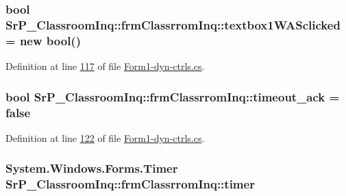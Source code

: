 \hypertarget{class_sr_p___classroom_inq_1_1frm_classrrom_inq_a998e499144884577e3445f4b721b4c6a}{
\subsubsection[{textbox1\-W\-A\-Sclicked}]{\setlength{\rightskip}{0pt plus 5cm}bool {\bf \-Sr\-P\-\_\-\-Classroom\-Inq\-::frm\-Classrrom\-Inq\-::textbox1\-W\-A\-Sclicked} = new bool()}}
\label{class_sr_p___classroom_inq_1_1frm_classrrom_inq_a998e499144884577e3445f4b721b4c6a}


\-Definition at line \hyperlink{_form1-dyn-ctrls_8cs_source_l00117}{117} of file \hyperlink{_form1-dyn-ctrls_8cs_source}{\-Form1-\/dyn-\/ctrls.\-cs}.

\hypertarget{class_sr_p___classroom_inq_1_1frm_classrrom_inq_a64cde7d8ac96b5122de783724c58103a}{
\subsubsection[{timeout\-\_\-ack}]{\setlength{\rightskip}{0pt plus 5cm}bool {\bf \-Sr\-P\-\_\-\-Classroom\-Inq\-::frm\-Classrrom\-Inq\-::timeout\-\_\-ack} = false}}
\label{class_sr_p___classroom_inq_1_1frm_classrrom_inq_a64cde7d8ac96b5122de783724c58103a}


\-Definition at line \hyperlink{_form1-dyn-ctrls_8cs_source_l00122}{122} of file \hyperlink{_form1-dyn-ctrls_8cs_source}{\-Form1-\/dyn-\/ctrls.\-cs}.

\hypertarget{class_sr_p___classroom_inq_1_1frm_classrrom_inq_ac5fec0fdbc135ddcefc976786801ee05}{
\subsubsection[{timer}]{\setlength{\rightskip}{0pt plus 5cm}\-System.\-Windows.\-Forms.\-Timer {\bf \-Sr\-P\-\_\-\-Classroom\-Inq\-::frm\-Classrrom\-Inq\-::timer}}}
\label{class_sr_p___classroom_inq_1_1frm_classrrom_inq_ac5fec0fdbc135ddcefc976786801ee05}


